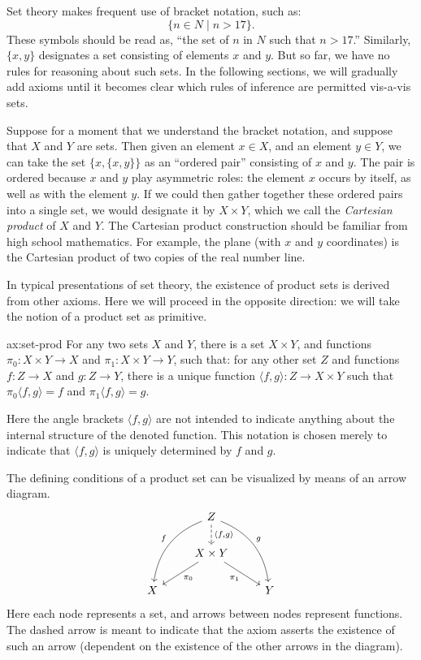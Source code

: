 Set theory makes frequent use of bracket notation, such as:
\[ \{ n\in N \mid n>17 \} .\] These symbols should be read as, ``the
set of $n$ in $N$ such that $n>17$.''  Similarly, $\{ x,y\}$ designates
a set consisting of elements $x$ and $y$.  But so far, we have no
rules for reasoning about such sets.  In the following sections, we
will gradually add axioms until it becomes clear which rules of
inference are permitted vis-a-vis sets.  

Suppose for a moment that we understand the bracket notation, and
suppose that $X$ and $Y$ are sets.  Then given an element $x\in X$,
and an element $y\in Y$, we can take the set $\{ x,\{ x,y\}\}$ as an
``ordered pair'' consisting of $x$ and $y$.  The pair is ordered
because $x$ and $y$ play asymmetric roles: the element $x$ occurs by
itself, as well as with the element $y$.  If we could then gather
together these ordered pairs into a single set, we would designate it
by $X\times Y$, which we call the \emph{Cartesian product} of $X$ and
$Y$.  The Cartesian product construction should be familiar from high
school mathematics.  For example, the plane (with $x$ and $y$
coordinates) is the Cartesian product of two copies of the real number
line.

In typical presentations of set theory, the existence of product sets
is derived from other axioms.  Here we will proceed in the opposite
direction: we will take the notion of a product set as primitive.

\bigskip

\begin{axi}{ax:set-prod} For any two sets $X$ and
  $Y$, there is a set $X\times Y$, and functions $\pi _0:X\times Y\to
  X$ and $\pi _1:X\times Y\to Y$, such that: for any other set $Z$ and
  functions $f:Z\to X$ and $g:Z\to Y$, there is a unique function
  $\langle f,g\rangle :Z\to X\times Y$ such that $\pi _0\langle
  f,g\rangle = f$ and $\pi _1\langle f,g\rangle =g$.
 \label{ax:set-prod} \end{axi}

Here the angle brackets $\langle f,g\rangle$ are not intended to
indicate anything about the internal structure of the denoted
function.  This notation is chosen merely to indicate that $\langle
f,g\rangle$ is uniquely determined by $f$ and $g$.

The defining conditions of a product set can be visualized by means of
an arrow diagram.  \[ \begin{tikzcd}
  & Z \arrow[ddl,bend right,"f"'] \arrow[ddr,bend left,"g"] \arrow[dashed,d,"{\langle f,g\rangle}"] \\
  & X\times Y \arrow[dl,"\pi _0"] \arrow[dr,"\pi _1"'] \\
  X & & Y
\end{tikzcd} \] Here each node represents a set, and arrows between
nodes represent functions.  The dashed arrow is meant to indicate that
the axiom asserts the existence of such an arrow (dependent on the
existence of the other arrows in the diagram).


